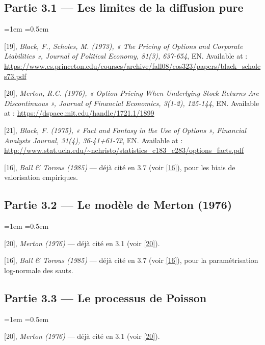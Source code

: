 \documentclass{article}
\begin{document}
\subsection*{Partie 3.1 --- Les limites de la diffusion pure}
\begin{list}{}{\leftmargin=1em \itemsep=0.5em}
\item \hypertarget{ref19}{} [19], \textit{Black, F., Scholes, M. (1973), « The Pricing of Options and Corporate Liabilities », Journal of Political Economy, 81(3), 637-654}, EN. Available at : \url{https://www.cs.princeton.edu/courses/archive/fall08/cos323/papers/black_scholes73.pdf}
\item \hypertarget{ref20}{} [20], \textit{Merton, R.C. (1976), « Option Pricing When Underlying Stock Returns Are Discontinuous », Journal of Financial Economics, 3(1-2), 125-144}, EN. Available at : \url{https://dspace.mit.edu/handle/1721.1/1899}
\item \hypertarget{ref21}{} [21], \textit{Black, F. (1975), « Fact and Fantasy in the Use of Options », Financial Analysts Journal, 31(4), 36-41+61-72}, EN. Available at : \url{http://www.stat.ucla.edu/~nchristo/statistics_c183_c283/options_facts.pdf}
\item \hypertarget{ref16}{} [16], \textit{Ball \& Torous (1985)} --- déjà cité en 3.7 (voir \hyperlink{ref16}{[16]}), pour les biais de valorisation empiriques.
\end{list}
\subsection*{Partie 3.2 --- Le modèle de Merton (1976)}
\begin{list}{}{\leftmargin=1em \itemsep=0.5em}
\item \hypertarget{ref20}{} [20], \textit{Merton (1976)} --- déjà cité en 3.1 (voir \hyperlink{ref20}{[20]}).
\item \hypertarget{ref16}{} [16], \textit{Ball \& Torous (1985)} --- déjà cité en 3.7 (voir \hyperlink{ref16}{[16]}), pour la paramétrisation log-normale des sauts.
\end{list}
\subsection*{Partie 3.3 --- Le processus de Poisson}
\begin{list}{}{\leftmargin=1em \itemsep=0.5em}
\item \hypertarget{ref20}{} [20], \textit{Merton (1976)} --- déjà cité en 3.1 (voir \hyperlink{ref20}{[20]}).
\end{list}
\end{document}
